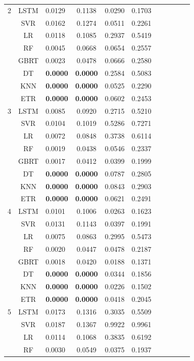 {\begin{longtable}{cclcccccccc}
  2 & LSTM & 0.0129 & 0.1138 & 0.0290 & 0.1703  \\
   & SVR & 0.0162 & 0.1274 & 0.0511 & 0.2261 \\
   & LR & 0.0118 & 0.1085 & 0.2937 & 0.5419\\
   & RF & 0.0045 & 0.0668 & 0.0654 & 0.2557 \\
   & GBRT & 0.0023 & 0.0478 & 0.0666 & 0.2580 \\
   & DT & \textbf{0.0000} & \textbf{0.0000} & 0.2584 & 0.5083 \\
   & KNN & \textbf{0.0000} & \textbf{0.0000} & 0.0525 & 0.2290 \\
   & ETR & \textbf{0.0000} & \textbf{0.0000} & 0.0602 & 0.2453 \\
  \hline
  3 & LSTM & 0.0085 & 0.0920 & 0.2715 & 0.5210  \\
   & SVR & 0.0104 & 0.1019 & 0.5286 & 0.7271 \\
   & LR & 0.0072 & 0.0848 & 0.3738 & 0.6114 \\
   & RF & 0.0019 & 0.0438 & 0.0546 & 0.2337 \\
   & GBRT & 0.0017 & 0.0412 & 0.0399 & 0.1999 \\
   & DT & \textbf{0.0000} & \textbf{0.0000} & 0.0787 & 0.2805 \\
   & KNN & \textbf{0.0000} & \textbf{0.0000} & 0.0843 & 0.2903 \\
   & ETR & \textbf{0.0000} & \textbf{0.0000} & 0.0621 & 0.2491 \\
  \hline
  4 & LSTM & 0.0101 & 0.1006 & 0.0263 & 0.1623 \\
   & SVR & 0.0131 & 0.1143 & 0.0397 & 0.1991  \\
   & LR & 0.0075 & 0.0863 & 0.2995 & 0.5473  \\
   & RF & 0.0020 & 0.0447 & 0.0478 & 0.2187  \\
   & GBRT & 0.0018 & 0.0420 & 0.0188 & 0.1371  \\
   & DT & \textbf{0.0000} & \textbf{0.0000} & 0.0344 & 0.1856 \\
   & KNN & \textbf{0.0000} & \textbf{0.0000} & 0.0226 & 0.1502 \\
   & ETR & \textbf{0.0000} & \textbf{0.0000} & 0.0418 & 0.2045 \\
  5 & LSTM & 0.0173 & 0.1316 & 0.3035 & 0.5509 \\
   & SVR & 0.0187 & 0.1367 & 0.9922 & 0.9961 \\
   & LR & 0.0114 & 0.1068 & 0.3835 & 0.6192 \\
   & RF & 0.0030 & 0.0549 & 0.0375 & 0.1937 \\

\end{longtable}}
